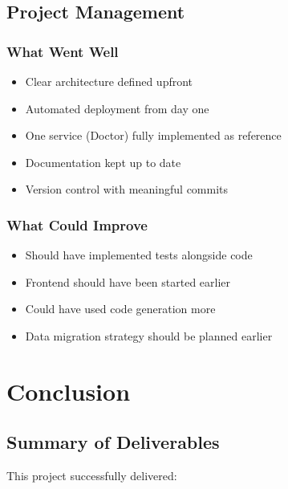 \documentclass[12pt,a4paper]{article}
\begin{document}
\subsection{Project Management}

\subsubsection{What Went Well}
\begin{itemize}
    \item Clear architecture defined upfront
    \item Automated deployment from day one
    \item One service (Doctor) fully implemented as reference
    \item Documentation kept up to date
    \item Version control with meaningful commits
\end{itemize}

\subsubsection{What Could Improve}
\begin{itemize}
    \item Should have implemented tests alongside code
    \item Frontend should have been started earlier
    \item Could have used code generation more
    \item Data migration strategy should be planned earlier
\end{itemize}

\section{Conclusion}

\subsection{Summary of Deliverables}

This project successfully delivered:
\end{document}
